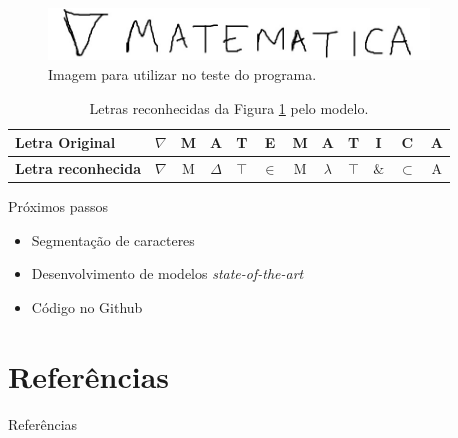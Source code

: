 \documentclass{beamer}
\begin{document}
    \begin{frame}
        \begin{figure}[htb]
            \centering
            \includegraphics[width=0.9\textwidth]{TesteMat.png}
            \caption{Imagem para utilizar no teste do programa.}
            \label{fig:nabmat}
        \end{figure}

        \begin{table}[htb]
            \centering
            \caption{Letras reconhecidas da Figura \ref{fig:nabmat} pelo modelo.}
            \label{tab:nabmat}
            \begin{adjustbox}{max width=\textwidth}
            \begin{tabular}{@{}lccccccccccc@{}}
                \toprule
                \textbf{Letra Original}    & $\nabla$ & M & A        & T      & E     & M & A         & T      & I    & C         & A \\ \midrule
                \textbf{Letra reconhecida} & $\nabla$ & M & $\Delta$ & $\top$ & $\in$ & M & $\lambda$ & $\top$ & $\&$ & $\subset$ & A \\ \bottomrule
            \end{tabular}
            \end{adjustbox}
        \end{table}
    \end{frame}

    \begin{frame}{Próximos passos}
        \begin{itemize}
            \item Segmentação de caracteres
            \item Desenvolvimento de modelos \emph{state-of-the-art}
            \item Código no Github
        \end{itemize}
    \end{frame}

\section{Referências}
    \begin{frame}[allowframebreaks]{Referências}
        \nocite{thomadata,tensorflow2015,zhang,elzad,nocedal,shai, ng,mitchell,wfan,julia,github,burfa,adam,bajmes,tensorflow2015}
        \printbibliography[heading=none]
    \end{frame}
\end{document}
